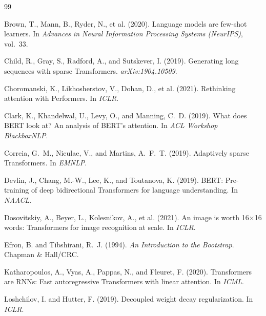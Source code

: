 \documentclass[11pt]{article}
\begin{document}

\begin{thebibliography}{99}

Brown, T., Mann, B., Ryder, N., et al. (2020).
\newblock Language models are few-shot learners.
\newblock In \textit{Advances in Neural Information Processing Systems (NeurIPS)}, vol.~33.

Child, R., Gray, S., Radford, A., and Sutskever, I. (2019).
\newblock Generating long sequences with sparse Transformers.
\newblock \textit{arXiv:1904.10509}.

Choromanski, K., Likhosherstov, V., Dohan, D., et al. (2021).
\newblock Rethinking attention with Performers.
\newblock In \textit{ICLR}.

Clark, K., Khandelwal, U., Levy, O., and Manning, C.~D. (2019).
\newblock What does BERT look at? An analysis of BERT's attention.
\newblock In \textit{ACL Workshop BlackboxNLP}.

Correia, G.~M., Niculae, V., and Martins, A.~F.~T. (2019).
\newblock Adaptively sparse Transformers.
\newblock In \textit{EMNLP}.

Devlin, J., Chang, M.-W., Lee, K., and Toutanova, K. (2019).
\newblock BERT: Pre-training of deep bidirectional Transformers for language understanding.
\newblock In \textit{NAACL}.

Dosovitskiy, A., Beyer, L., Kolesnikov, A., et al. (2021).
\newblock An image is worth 16$\times$16 words: Transformers for image recognition at scale.
\newblock In \textit{ICLR}.

Efron, B. and Tibshirani, R.~J. (1994).
\newblock \textit{An Introduction to the Bootstrap}.
\newblock Chapman \& Hall/CRC.

Katharopoulos, A., Vyas, A., Pappas, N., and Fleuret, F. (2020).
\newblock Transformers are RNNs: Fast autoregressive Transformers with linear attention.
\newblock In \textit{ICML}.

Loshchilov, I. and Hutter, F. (2019).
\newblock Decoupled weight decay regularization.
\newblock In \textit{ICLR}.


\end{thebibliography}
\end{document}
